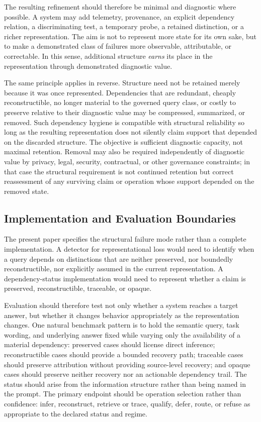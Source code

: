 \documentclass[11pt]{article}
\theoremstyle{definition}
\theoremstyle{remark}
\begin{document}
The resulting refinement should therefore be minimal and diagnostic where possible. A system may add telemetry, provenance, an explicit dependency relation, a discriminating test, a temporary probe, a retained distinction, or a richer representation. The aim is not to represent more state for its own sake, but to make a demonstrated class of failures more observable, attributable, or correctable. In this sense, additional structure \emph{earns} its place in the representation through demonstrated diagnostic value.

The same principle applies in reverse. Structure need not be retained merely because it was once represented. Dependencies that are redundant, cheaply reconstructible, no longer material to the governed query class, or costly to preserve relative to their diagnostic value may be compressed, summarized, or removed. Such dependency hygiene is compatible with structural reliability so long as the resulting representation does not silently claim support that depended on the discarded structure. The objective is sufficient diagnostic capacity, not maximal retention. Removal may also be required independently of diagnostic value by privacy, legal, security, contractual, or other governance constraints; in that case the structural requirement is not continued retention but correct reassessment of any surviving claim or operation whose support depended on the removed state.

\subsection{Implementation and Evaluation Boundaries}

The present paper specifies the structural failure mode rather than a complete implementation. A detector for representational loss would need to identify when a query depends on distinctions that are neither preserved, nor boundedly reconstructible, nor explicitly assumed in the current representation. A dependency-status implementation would need to represent whether a claim is preserved, reconstructible, traceable, or opaque.

Evaluation should therefore test not only whether a system reaches a target answer, but whether it changes behavior appropriately as the representation changes. One natural benchmark pattern is to hold the semantic query, task wording, and underlying answer fixed while varying only the availability of a material dependency: preserved cases should license direct inference; reconstructible cases should provide a bounded recovery path; traceable cases should preserve attribution without providing source-level recovery; and opaque cases should preserve neither recovery nor an actionable dependency trail. The status should arise from the information structure rather than being named in the prompt. The primary endpoint should be operation selection rather than confidence: infer, reconstruct, retrieve or trace, qualify, defer, route, or refuse as appropriate to the declared status and regime.
\end{document}
